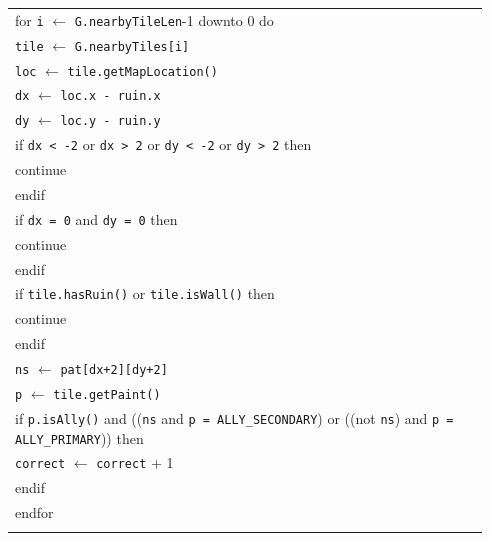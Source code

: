 \documentclass{article}
\newenvironment{pseudobox}
{
\centering
\begin{longtable}{|p{0.94\linewidth}|}
\hline
}
{
\\ \hline
\end{longtable}
\vspace{0.05cm}
}
\begin{document}
\begin{enumerate}[label=\alph*.]
\begin{enumerate}[label=\alph*.]
\begin{pseudobox}
\hspace*{1.5em}for \texttt{i} $\leftarrow$ \texttt{G.nearbyTileLen}-1 downto 0 do \\
\hspace*{3em}\texttt{tile} $\leftarrow$ \texttt{G.nearbyTiles[i]} \\
\hspace*{3em}\texttt{loc} $\leftarrow$ \texttt{tile.getMapLocation()} \\
\hspace*{3em}\texttt{dx} $\leftarrow$ \texttt{loc.x - ruin.x} \\
\hspace*{3em}\texttt{dy} $\leftarrow$ \texttt{loc.y - ruin.y} \\

\hspace*{3em}if \texttt{dx < -2} or \texttt{dx > 2} or \texttt{dy < -2} or \texttt{dy > 2} then \\
\hspace*{4.5em}continue \\
\hspace*{3em}endif \\

\hspace*{3em}if \texttt{dx = 0} and \texttt{dy = 0} then \\
\hspace*{4.5em}continue \\
\hspace*{3em}endif \\

\hspace*{3em}if \texttt{tile.hasRuin()} or \texttt{tile.isWall()} then \\
\hspace*{4.5em}continue \\
\hspace*{3em}endif \\

\hspace*{3em}\texttt{ns} $\leftarrow$ \texttt{pat[dx+2][dy+2]} \\
\hspace*{3em}\texttt{p} $\leftarrow$ \texttt{tile.getPaint()} \\

\hspace*{3em}if \texttt{p.isAlly()} and ((\texttt{ns} and \texttt{p = ALLY\_SECONDARY}) or ((not \texttt{ns}) and \texttt{p = ALLY\_PRIMARY})) then \\
\hspace*{4.5em}\texttt{correct} $\leftarrow$ \texttt{correct} + 1 \\
\hspace*{3em}endif \\
\hspace*{1.5em}endfor \\


\end{pseudobox}
\end{enumerate}
\end{enumerate}
\end{document}
